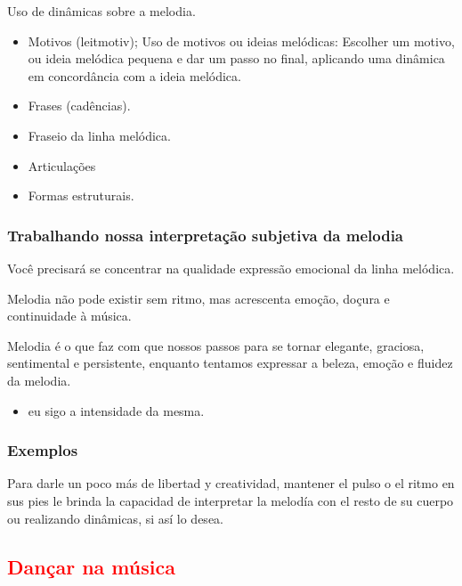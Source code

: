 Uso de dinâmicas sobre a melodia. 
\begin{itemize}
\item Motivos (leitmotiv); Uso de motivos ou ideias melódicas: Escolher um motivo, ou ideia melódica pequena e dar um passo no final, 
aplicando uma dinâmica em concordância com a ideia melódica.
\item Frases (cadências).
\item Fraseio da linha melódica.
\item Articulações
\item Formas estruturais.
\end{itemize}



\subsubsection{Trabalhando nossa interpretação subjetiva da melodia} 

Você precisará se concentrar na qualidade expressão emocional da linha melódica.

Melodia não pode existir sem ritmo, mas acrescenta emoção, doçura e continuidade à música.

Melodia é o que faz com que nossos passos para se tornar elegante, 
graciosa, sentimental e persistente, enquanto tentamos expressar a beleza, emoção e fluidez da melodia.


\begin{itemize}
\item eu sigo a intensidade da mesma.
\end{itemize}

\subsubsection{Exemplos} 

Para darle un poco más de libertad y creatividad, 
mantener el pulso o el ritmo en sus pies le brinda la capacidad de interpretar 
la melodía con el resto de su cuerpo ou realizando dinâmicas, si así lo desea.



\subsection{\textcolor{red}{Dançar na música}}
\label{subsec:dancamusica}

